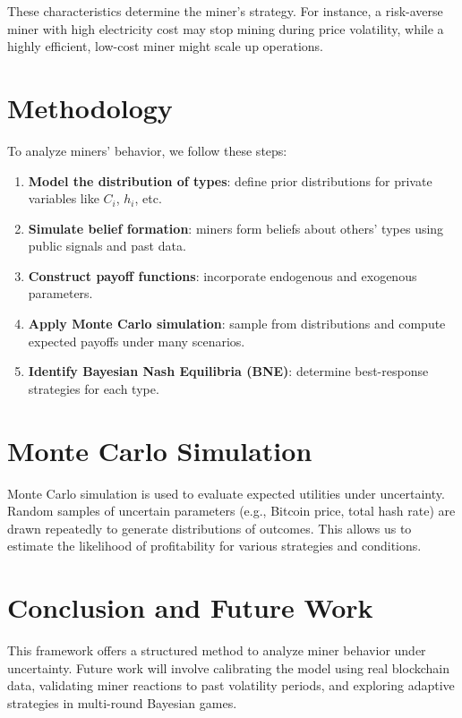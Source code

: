 \documentclass[12pt]{article}
\begin{document}
These characteristics determine the miner's strategy. For instance, a risk-averse miner with high electricity cost may stop mining during price volatility, while a highly efficient, low-cost miner might scale up operations.

\section{Methodology}
To analyze miners' behavior, we follow these steps:
\begin{enumerate}
	\item \textbf{Model the distribution of types}: define prior distributions for private variables like $C_i$, $h_i$, etc.
	\item \textbf{Simulate belief formation}: miners form beliefs about others' types using public signals and past data.
	\item \textbf{Construct payoff functions}: incorporate endogenous and exogenous parameters.
	\item \textbf{Apply Monte Carlo simulation}: sample from distributions and compute expected payoffs under many scenarios.
	\item \textbf{Identify Bayesian Nash Equilibria (BNE)}: determine best-response strategies for each type.
\end{enumerate}

\section{Monte Carlo Simulation}
Monte Carlo simulation is used to evaluate expected utilities under uncertainty. Random samples of uncertain parameters (e.g., Bitcoin price, total hash rate) are drawn repeatedly to generate distributions of outcomes. This allows us to estimate the likelihood of profitability for various strategies and conditions.

\section{Conclusion and Future Work}
This framework offers a structured method to analyze miner behavior under uncertainty. Future work will involve calibrating the model using real blockchain data, validating miner reactions to past volatility periods, and exploring adaptive strategies in multi-round Bayesian games.



\end{document}
